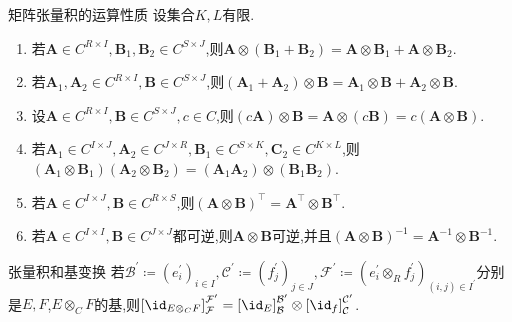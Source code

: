 \begin{proposition}{矩阵张量积的运算性质}{}
	设集合$K,L$有限.
	\begin{enumerate}
		\item 若$\boldsymbol{A}\in C^{R\times I},\boldsymbol{B}_{1},\boldsymbol{B}_{2}\in C^{S\times J}$,则$\boldsymbol{A}\otimes\left(\boldsymbol{B}_{1}+\boldsymbol{B}_{2}\right)=\boldsymbol{A}\otimes\boldsymbol{B}_{1}+\boldsymbol{A}\otimes\boldsymbol{B}_{2}$.
		\item 若$\boldsymbol{A}_{1},\boldsymbol{A}_{2}\in C^{R\times I},\boldsymbol{B}\in C^{S\times J}$,则$\left(\boldsymbol{A}_{1}+\boldsymbol{A}_{2}\right)\otimes\boldsymbol{B}=\boldsymbol{A}_{1}\otimes\boldsymbol{B}+\boldsymbol{A}_{2}\otimes\boldsymbol{B}$.
		\item 设$\boldsymbol{A}\in C^{R\times I},\boldsymbol{B}\in C^{S\times J},c\in C$,则$\left(c\boldsymbol{A}\right)\otimes\boldsymbol{B}=\boldsymbol{A}\otimes\left(c\boldsymbol{B}\right)=c\left(\boldsymbol{A}\otimes\boldsymbol{B}\right)$.
		\item 若$\boldsymbol{A}_{1}\in C^{I\times J},\boldsymbol{A}_{2}\in C^{J\times R},\boldsymbol{B}_{1}\in C^{S\times K},\boldsymbol{C}_{2}\in C^{K\times L}$,则$\left(\boldsymbol{A}_{1}\otimes\boldsymbol{B}_{1}\right)\left(\boldsymbol{A}_{2}\otimes\boldsymbol{B}_{2}\right)=\left(\boldsymbol{A}_{1}\boldsymbol{A}_{2}\right)\otimes\left(\boldsymbol{B}_{1}\boldsymbol{B}_{2}\right)$.
		\item 若$\boldsymbol{A}\in C^{I\times J},\boldsymbol{B}\in C^{R\times S}$,则$\left(\boldsymbol{A}\otimes\boldsymbol{B}\right)^{\top}=\boldsymbol{A}^{\top}\otimes\boldsymbol{B}^{\top}$.
		\item 若$\boldsymbol{A}\in C^{I\times I},\boldsymbol{B}\in C^{J\times J}$都可逆,则$\boldsymbol{A}\otimes\boldsymbol{B}$可逆,并且$\left(\boldsymbol{A}\otimes\boldsymbol{B}\right)^{-1}=\boldsymbol{A}^{-1}\otimes\boldsymbol{B}^{-1}$.
	\end{enumerate}
\end{proposition}

\begin{proposition}{张量积和基变换}{}
	若$\mathcal{B}^{\prime}\coloneq\left(e_{i}^{\prime}\right)_{i\in I},\mathcal{C}^{\prime}\coloneq\left(f_{j}^{\prime}\right)_{j\in J},\mathcal{F}^{\prime}\coloneq\left(e_{i}^{\prime}\otimes_{R}f_{j}^{\prime}\right)_{\left(i,j\right)\in I^{\prime}}$分别是$E,F$,$E\otimes_{C}F$的基,则$\left[\id_{E\otimes_{C}F}\right]_{\mathcal{F}}^{\mathcal{F}^{\prime}}=\left[\id_{E}\right]_{\mathcal{B}}^{\mathcal{B}^{\prime}}\otimes \left[\id_{f}\right]_{\mathcal{C}}^{\mathcal{C}^{\prime}}$.
\end{proposition}

